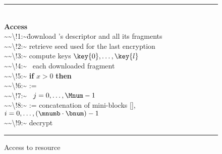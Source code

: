 \begin{figure}[!t]
\begin{footnotesize}
\hrule          %
\begin{tabbing}
\hfill\\
{\bf Access}\\[1em]
\num{~~\!1:~}\= download \resource's descriptor and all its fragments \\[0.3em]
\num{~~\!2:~}\1 retrieve seed  used for the last encryption \\[0.3em]
\num{~~\!3:~}\1 compute keys $\key{0},\ldots,\key{l}$\\[0.3em]
\num{~~\!4:~}\1 \myfor\  each downloaded fragment   \\[0.3em]
\num{~~\!5:~}\2     {\bf if} $x>0$ {\bf then} \\[0.3em]
\num{~~\!6:~}\2      :=  \\[0.3em]
\num{~~\!7:~}\1 \myfor\ $j=0,\ldots,\Mnum-1$  \\[0.3em]
\num{~~\!8:~}\2      := concatenation of mini-blocks [], $i=0,\ldots, (\mnumb \cdot \bnum)-1$\\[0.3em]
\num{~~\!9:~}\2     decrypt 
\end{tabbing}
\hrule
\vspace{.5em}
\end{footnotesize}
\caption{\label{ms:fig:access}Access to resource \resource}
\end{figure}

